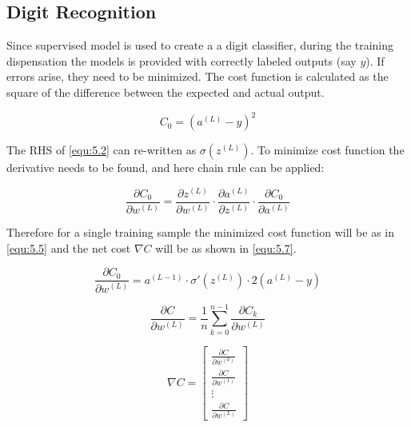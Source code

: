 \documentclass[12pt, a4paper]{report}
\begin{document}
\subsection{Digit Recognition}
Since supervised model is used to create a a digit classifier, during the training dispensation the models is provided with correctly labeled outputs (say $y$). If errors arise, they need to be minimized. The cost function is calculated as the square of the difference between the expected and actual output.

\begin{equation}
    \label{equ:5.3}
    C_0 = (a^{(L)} - y)^2
\end{equation}

The RHS of \eqref{equ:5.2} can re-written as $\sigma(z^{(L)})$. To minimize cost function the derivative needs to be found, and here chain rule can be applied:

\begin{equation}
    \label{equ:5.4}
    \frac{\partial C_0}{\partial w^{(L)}} = \frac{\partial z^{(L)}}{\partial w^{(L)}} \cdot \frac{\partial a^{(L)}}{\partial z^{(L)}} \cdot \frac{\partial C_0}{\partial a^{(L)}}
\end{equation}

Therefore for a single training sample the minimized cost function will be as in \eqref{equ:5.5} and the net cost $\nabla C$ will be as shown in \eqref{equ:5.7}.

\begin{equation}
    \label{equ:5.5}
    \frac{\partial C_0}{\partial w^{(L)}} = a^{(L-1)} \cdot \sigma'(z^{(L)}) \cdot 2(a^{(L)} - y)
\end{equation}

\begin{equation}
    \label{equ:5.6}
    \frac{\partial C}{\partial w^{(L)}} = \frac{1}{n} \sum_{k = 0}^{n - 1} \frac{\partial C_k}{\partial w^{(L)}}
\end{equation}

\begin{equation}
    \label{equ:5.7}
    \nabla C = \begin{bmatrix}
        \frac{\partial C}{\partial w^{(0)}} \\[1em]
        \frac{\partial C}{\partial w^{(1)}} \\[1em]
        \vdots                              \\[1em]
        \frac{\partial C}{\partial w^{(L)}}
    \end{bmatrix}
\end{equation}
\end{document}
